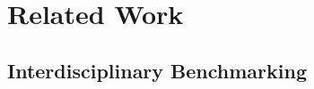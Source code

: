 \vspace{-2pt}
\section{Related Work}
\label{sec:related_work}


\subsection{Interdisciplinary Benchmarking}
\label{sec:related_benchmarking}  

